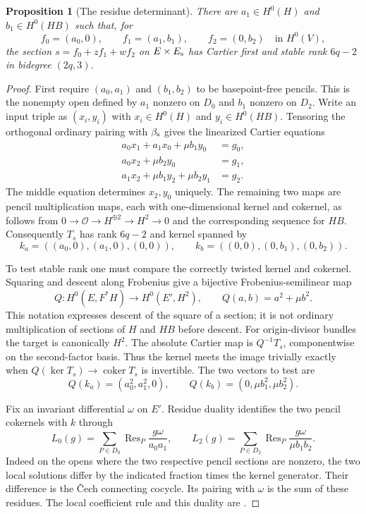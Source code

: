 \documentclass[11pt]{article}
\newtheorem{proposition}[theorem]{Proposition}
\theoremstyle{definition}\newtheorem{definition}[theorem]{Definition}
\theoremstyle{remark}\newtheorem{remark}[theorem]{Remark}
\newcommand{\OO}{\mathcal O}
\begin{document}
\begin{proposition}[The residue determinant]\label{prop:residue}
There are $a_1\in H^0(H)$ and $b_1\in H^0(HB)$ such that, for
\[
 f_0=(a_0,0),\qquad f_1=(a_1,b_1),\qquad f_2=(0,b_2)
 \quad\text{in }H^0(V),
\]
the section $s=f_0+zf_1+wf_2$ on $E\times E_{\rm s}$ has Cartier first and stable rank $6q-2$ in bidegree $(2q,3)$.
\end{proposition}
\begin{proof}
First require $(a_0,a_1)$ and $(b_1,b_2)$ to be basepoint-free pencils. This is the nonempty open defined by $a_1$ nonzero on $D_0$ and $b_1$ nonzero on $D_2$. Write an input triple as $(x_i,y_i)$ with $x_i\in H^0(H)$ and $y_i\in H^0(HB)$. Tensoring the orthogonal ordinary pairing with $\beta_{\rm s}$ gives the linearized Cartier equations
\begin{align}
 a_0x_1+a_1x_0+\mu b_1y_0&=g_0,\label{eq:res0}\\
 a_0x_2+\mu b_2y_0&=g_1,\label{eq:res1}\\
 a_1x_2+\mu b_1y_2+\mu b_2y_1&=g_2.\label{eq:res2}
\end{align}
The middle equation determines $x_2,y_0$ uniquely. The remaining two maps are pencil multiplication maps, each with one-dimensional kernel and cokernel, as follows from
$0\to\OO\to H^{\oplus2}\to H^2\to0$ and the corresponding sequence for $HB$. Consequently $T_s$ has rank $6q-2$ and kernel spanned by
\[
 k_a=((a_0,0),(a_1,0),(0,0)),\qquad
 k_b=((0,0),(0,b_1),(0,b_2)).
\]

To test stable rank one must compare the correctly twisted kernel and cokernel. Squaring and descent along Frobenius give a bijective Frobenius-semilinear map
\[
 Q:H^0(E,F^*H)\longrightarrow H^0(E',H^2),
 \qquad Q(a,b)=a^2+\mu b^2.
\]
This notation expresses descent of the square of a section; it is not ordinary multiplication of sections of $H$ and $HB$ before descent. For origin-divisor bundles the target is canonically $H^2$. The absolute Cartier map is $Q^{-1}T_s$, componentwise on the second-factor basis. Thus the kernel meets the image trivially exactly when
$Q(\ker T_s)\to\operatorname{coker}T_s$ is invertible. The two vectors to test are
\[
 Q(k_a)=(a_0^2,a_1^2,0),\qquad
 Q(k_b)=(0,\mu b_1^2,\mu b_2^2).
\]

Fix an invariant differential $\omega$ on $E'$. Residue duality identifies the two pencil cokernels with $k$ through
\[
 L_0(g)=\sum_{P\in D_0}\operatorname{Res}_P\frac{g\omega}{a_0a_1},
 \qquad
 L_2(g)=\sum_{P\in D_2}\operatorname{Res}_P\frac{g\omega}{\mu b_1b_2}.
\]
Indeed on the opens where the two respective pencil sections are nonzero, the two local solutions differ by the indicated fraction times the kernel generator. Their difference is the \v Cech connecting cocycle. Its pairing with $\omega$ is the sum of these residues. The local coefficient rule and this duality are \citet[Theorem~2, p.~155; \S4, pp.~157--159]{Tate}.


\end{proof}
\end{document}
